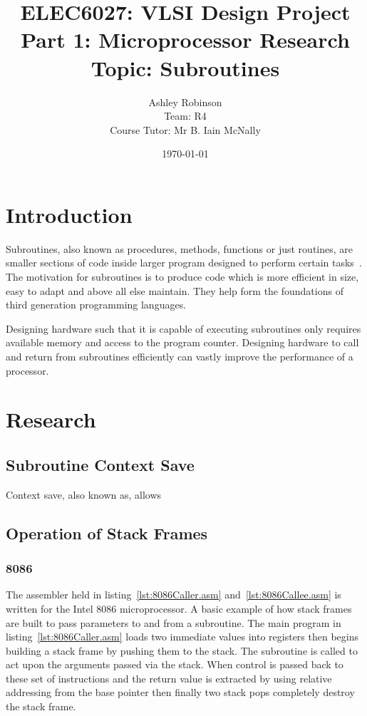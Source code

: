 \documentclass[12pt,a4paper]{article}
\title{ELEC6027: VLSI Design Project \\Part 1: Microprocessor Research\\Topic: Subroutines}
\author{Ashley Robinson\\ Team: R4\\Course Tutor: Mr B. Iain McNally}
\date{\today}
\begin{document}
\begin{titlepage}
\maketitle
\end{titlepage}

\tableofcontents
\clearpage

\lstset{
   frame=L,
   basicstyle=\footnotesize,        %
   captionpos=b
}


\section{Introduction}

Subroutines, also known as procedures, methods, functions or just routines, are smaller sections of code inside larger program designed to perform certain tasks~\cite{alison}.
The motivation for subroutines is to produce code which is more efficient in size, easy to adapt and above all else maintain. 
They help form the foundations of third generation programming languages.

Designing hardware such that it is capable of executing subroutines only requires available memory and access to the program counter.
Designing hardware to call and return from subroutines efficiently can vastly improve the performance of a processor. 


\section{Research}

\subsection{Subroutine Context Save }
Context save, also known as, allows 
\subsection{Operation of Stack Frames}


\newpage
\subsubsection{8086}
The assembler held in listing~\ref{lst:8086Caller.asm} and~\ref{lst:8086Callee.asm} is written for the Intel 8086 microprocessor.
A basic example of how stack frames are built to pass parameters to and from a subroutine.
The main program in listing~\ref{lst:8086Caller.asm} loads two immediate values into registers then begins building a stack frame by pushing them to the stack.  
The subroutine is called to act upon the arguments passed via the stack.
When control is passed back to these set of instructions and the return value is extracted by using relative addressing from the base pointer then finally two stack pops completely destroy the stack frame.
\end{document}
